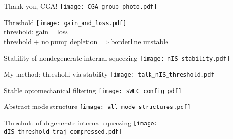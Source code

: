 \documentclass[12pt,xcolor=dvipsnames]{beamer}
\begin{document}
{
	\begin{frame}[noframenumbering]{Thank you, CGA!}
	\centering
	\vspace*{-1.5cm}
	\texttt{[image: CGA\_group\_photo.pdf]}
	\end{frame}
}



\begin{frame}[noframenumbering]{Threshold}
\centering
\texttt{[image: gain\_and\_loss.pdf]}
\\\vspace*{1cm}
\large{threshold: gain$=$loss}
\\\vspace*{0.5cm}threshold + no pump depletion$\implies$borderline unstable
\end{frame}

\begin{frame}[noframenumbering]{Stability of nondegenerate internal squeezing}
\centering
\texttt{[image: nIS\_stability.pdf]}
\end{frame}

\begin{frame}[noframenumbering]{My method: threshold via stability}
\centering
\texttt{[image: talk\_nIS\_threshold.pdf]}
\end{frame}

\begin{frame}[noframenumbering]{Stable optomechanical filtering}
\centering
\texttt{[image: sWLC\_config.pdf]}
\end{frame}

\begin{frame}[noframenumbering]{Abstract mode structure}
\centering
\texttt{[image: all\_mode\_structures.pdf]}
\end{frame}

\begin{frame}[noframenumbering]{Threshold of degenerate internal squeezing}
\centering
\texttt{[image: dIS\_threshold\_traj\_compressed.pdf]}
\end{frame}
\end{document}
